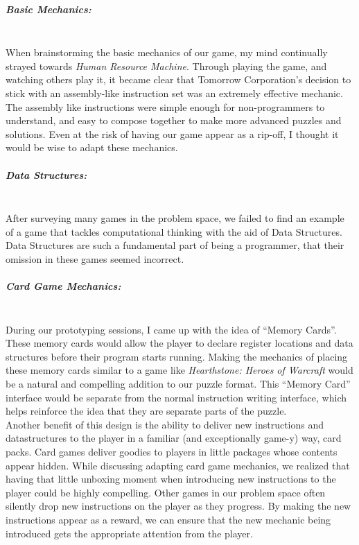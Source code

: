 \subparagraph{Basic Mechanics:}\mbox{} \\
When brainstorming the basic mechanics of our game, my mind continually strayed towards \textit{Human Resource Machine}. 
Through playing the game, and watching others play it, it became clear that Tomorrow Corporation's decision to stick with 
an assembly-like instruction set was an extremely effective mechanic.\\

The assembly like instructions were simple enough for non-programmers to understand, and easy to compose together to make more
advanced puzzles and solutions. Even at the risk of having our game appear as a rip-off, I thought it would be wise to adapt 
these mechanics.

\subparagraph{Data Structures:}\mbox{} \\
After surveying many games in the problem space, we failed to find an example of a game that tackles computational thinking
with the aid of Data Structures. Data Structures are such a fundamental part of being a programmer, that their omission in these 
games seemed incorrect.

\subparagraph{Card Game Mechanics:}\mbox{} \\
During our prototyping sessions, I came up with the idea of “Memory Cards”. 
These memory cards would allow the player to declare register locations and data 
structures before their program starts running. Making the mechanics of placing these 
memory cards similar to a game like \textit{Hearthstone: Heroes of Warcraft} would be 
a natural and compelling addition to our puzzle format. This “Memory Card” interface 
would be separate from the normal instruction writing interface, which helps reinforce 
the idea that they are separate parts of the puzzle. \\

Another benefit of this design is the ability to deliver new instructions and datastructures
to the player in a familiar (and exceptionally game-y) way, card packs. Card games deliver 
goodies to players in little packages whose contents appear hidden. While discussing adapting 
card game mechanics, we realized that having that little unboxing moment when introducing new
instructions to the player could be highly compelling. Other games in our problem space often 
silently drop new instructions on the player as they progress. By making the new instructions 
appear as a reward, we can ensure that the new mechanic being introduced gets the appropriate 
attention from the player.

